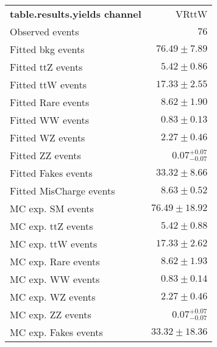 

\begin{table}
\begin{center}
\setlength{\tabcolsep}{0.0pc}
{\small
\begin{tabular*}{\textwidth}{@{\extracolsep{\fill}}lr}
\noalign{\smallskip}\hline\noalign{\smallskip}
{\bf table.results.yields channel}           & VRttW              \\[-0.05cm]
\noalign{\smallskip}\hline\noalign{\smallskip}
Observed events          & $76$                    \\
\noalign{\smallskip}\hline\noalign{\smallskip}
Fitted bkg events         & $76.49 \pm 7.89$              \\
\noalign{\smallskip}\hline\noalign{\smallskip}
        Fitted ttZ events         & $5.42 \pm 0.86$              \\
        Fitted ttW events         & $17.33 \pm 2.55$              \\
        Fitted Rare events         & $8.62 \pm 1.90$              \\
        Fitted WW events         & $0.83 \pm 0.13$              \\
        Fitted WZ events         & $2.27 \pm 0.46$              \\
        Fitted ZZ events         & $0.07_{-0.07}^{+0.07}$              \\
        Fitted Fakes events         & $33.32 \pm 8.66$              \\
        Fitted MisCharge events         & $8.63 \pm 0.52$              \\
 \noalign{\smallskip}\hline\noalign{\smallskip}
MC exp. SM events              & $76.49 \pm 18.92$              \\
\noalign{\smallskip}\hline\noalign{\smallskip}
        MC exp. ttZ events         & $5.42 \pm 0.88$              \\
        MC exp. ttW events         & $17.33 \pm 2.62$              \\
        MC exp. Rare events         & $8.62 \pm 1.93$              \\
        MC exp. WW events         & $0.83 \pm 0.14$              \\
        MC exp. WZ events         & $2.27 \pm 0.46$              \\
        MC exp. ZZ events         & $0.07_{-0.07}^{+0.07}$              \\
        MC exp. Fakes events         & $33.32 \pm 18.36$              \\

\end{tabular*}}
\end{center}
\end{table}
